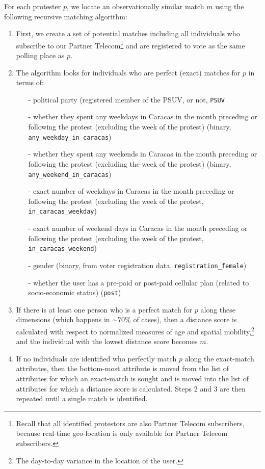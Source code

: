 \documentclass[12pt]{article}
\begin{document}
For each protester $p$, we locate an observationally similar match $m$ using the following recursive matching algorithm:
\begin{enumerate}
    \item First, we create a set of potential matches including all individuals who subscribe to our Partner Telecom\footnote{Recall that all identified protestors are also Partner Telecom subscribers, because real-time geo-location is only available for Partner Telecom subscribers.} and are registered to vote as the same polling place as $p$.
    \item The algorithm looks for individuals who are perfect (exact) matches for $p$ in terms of:
    \begin{itemize}
        \item[-] political party (registered member of the PSUV, or not, \texttt{PSUV}
        \item[-] whether they spent any weekdays in Caracas in the month preceding or following the protest (excluding the week of the protest) (binary, \texttt{any\_weekday\_in\_caracas})
        \item[-] whether they spent any weekends in Caracas in the month preceding or following the protest (excluding the week of the protest) (binary, \texttt{any\_weekend\_in\_caracas})
        \item[-] exact number of weekdays in Caracas in the month preceding or following the protest (excluding the week of the protest, \texttt{in\_caracas\_weekday})
        \item[-] exact number of weekend days in Caracas in the month preceding or following the protest (excluding the week of the protest, \texttt{in\_caracas\_weekend})
        \item[-] gender (binary, from voter registration data, \texttt{registration\_female})
        \item[-] whether the user has a pre-paid or post-paid cellular plan (related to socio-economic status) (\texttt{post})
    \end{itemize}
    \item If there is at least one person who is a perfect match for $p$ along these dimensions (which happens in $\sim70\%$ of cases), then a distance score is calculated with respect to normalized measures of age and spatial mobility,\footnote{The day-to-day variance in the location of the user.} and the individual with the lowest distance score becomes $m$.
    \item If no individuals are identified who perfectly match $p$ along the exact-match attributes, then the bottom-most attribute is moved from the list of attributes for which an exact-match is sought and is moved into the list of attributes for which a distance score is calculated. Steps 2 and 3 are then repeated until a single match is identified.
\end{enumerate}
\end{document}
